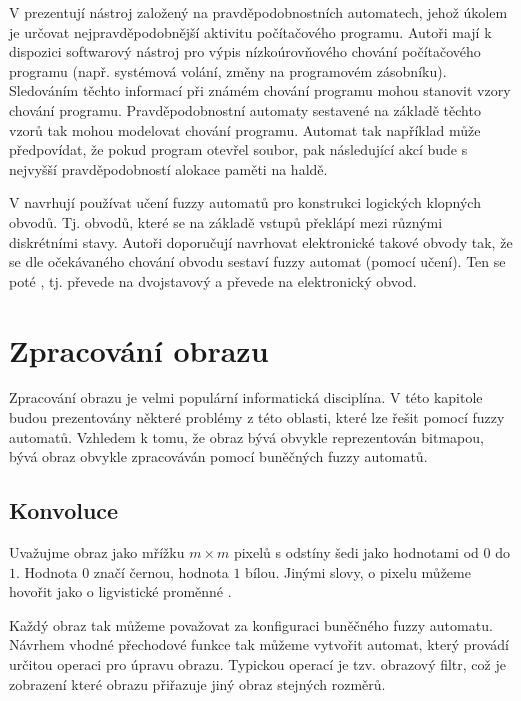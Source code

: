 \documentclass[a4paper,10pt]{article}
\begin{document}
V \cite{Maz+-ProTreAutAppBehMod} prezentují nástroj založený na pravděpodobnostních automatech, jehož úkolem je určovat nejpravděpodobnější aktivitu počítačového programu. Autoři mají k dispozici softwarový nástroj pro výpis nízkoúrovňového chování počítačového programu (např. systémová volání, změny na programovém zásobníku). Sledováním těchto informací při známém chování programu mohou stanovit vzory chování programu. Pravděpodobnostní automaty sestavené na základě těchto vzorů tak mohou modelovat chování programu. Automat tak například může předpovídat, že pokud program otevřel soubor, pak následující akcí bude s nejvyšší pravděpodobností alokace paměti na haldě.

V \cite{PedGac-LeaFuzzAut} navrhují používat učení fuzzy automatů pro konstrukci logických klopných obvodů. Tj. obvodů, které se na základě vstupů překlápí mezi různými diskrétními stavy. Autoři doporučují navrhovat elektronické takové obvody tak, že se dle očekávaného chování obvodu sestaví fuzzy automat (pomocí učení). Ten se poté , tj. převede na dvojstavový a převede na elektronický obvod.

\section{Zpracování obrazu} \label{cha:ImgProc}
Zpracování obrazu je velmi populární informatická disciplína. V této kapitole budou prezentovány některé problémy z této oblasti, které lze řešit pomocí fuzzy automatů. Vzhledem k tomu, že obraz bývá obvykle reprezentován bitmapou, bývá obraz obvykle zpracováván pomocí buněčných fuzzy automatů.

\subsection{Konvoluce} \label{subs:Convol}
Uvažujme obraz jako mřížku $m \times m$ pixelů s odstíny šedi jako hodnotami od $0$ do $1$. Hodnota $0$ značí černou, hodnota $1$ bílou. Jinými slovy, o pixelu můžeme hovořit jako o ligvistické proměnné .

Každý obraz tak můžeme považovat za konfiguraci buněčného fuzzy automatu. Návrhem vhodné přechodové funkce tak můžeme vytvořit automat, který provádí určitou operaci pro úpravu obrazu. Typickou operací je tzv. obrazový filtr, což je zobrazení které obrazu přiřazuje jiný obraz stejných rozměrů.
\end{document}
